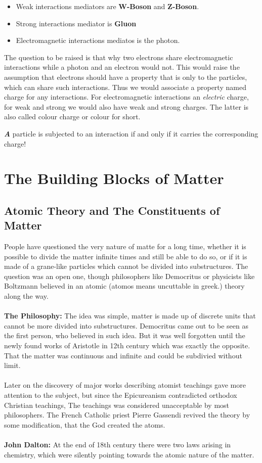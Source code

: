 \documentclass[11pt,a4paper]{article}
\newcounter{theo}
\newenvironment{callout}
	{\begin{calloutbox}\color{charcoal}\textbf\textit}
	{\end{calloutbox}}
\begin{document}
\begin{itemize}
     \item Weak interactions mediators are \textbf{W-Boson} and \textbf{Z-Boson}.
     \item Strong interactions mediator is \textbf{Gluon}
     \item Electromagnetic interactions mediatos is the photon.
\end{itemize}

The question to be raised is that why two electrons share electromagnetic interactions while a photon and an electron would not. This would raise the assumption that electrons should have a property that is only to the particles, which can share such interactions. Thus we would associate a property named charge for any interactions. For electromagnetic interactions an \textit{electric} charge, for weak and strong we would also have weak and strong charges. The latter is also called colour charge or colour for short.

\begin{callout}
     A particle is subjected to an interaction if and only if it carries the corresponding charge!
\end{callout}

\section{The Building Blocks of Matter}
\subsection{Atomic Theory and The Constituents of Matter}
People have questioned the very nature of matte for a long time, whether it is possible to divide the matter infinite times and still be able to do so, or if it is made of a grane-like particles which cannot be divided into substructures. The question was an open one, though philosophers like Democritus or physicists like Boltzmann believed in an atomic (atomos means uncuttable in greek.) theory along the way. 
\\
\\
\textbf{The Philosophy:} The idea was simple, matter is made up of discrete units that cannot be more divided into substructures. Democritus came out to be seen as the first person, who believed in such idea. But it was well forgotten until the newly found works of Aristotle in 12th century which was exactly the opposite. That the matter was continuous and infinite and could be subdivied without limit.
\\
\\
Later on the discovery of major works describing atomist teachings gave more attention to the subject, but since the Epicureanism contradicted orthodox Christian teachings, The teachings was considered unacceptable by most philosophers. The French Catholic priest Pierre Gassendi revived the theory by some modification, that the God created the atoms.
\\
\\
\textbf{John Dalton:} At the end of 18th century there were two laws arising in chemistry, which were silently pointing towards the atomic nature of the matter. 
\end{document}
